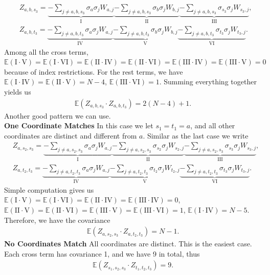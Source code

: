 \documentclass[10pt]{article}
\newcommand{\e}{\mathbb{E}}
\newenvironment{Proof of lemma}{\noindent{\bf Proof of Lemma}}{\hfill$\Box$\newline}
\newenvironment{Proof of claim}{\noindent{\bf Proof of claim}}{\hfill$\Box$\newline}
\newenvironment{Proof of theorem}{\noindent{\bf Proof of Theorem}}{\hfill\scriptsize{$\Box$}\newline}
\newenvironment{Proof of theorems}{\noindent{\bf Proof of Theorems}}{\hfill$\Box$\newline}
\newenvironment{Proof of proposition}{\noindent{\bf Proof of Proposition}}{\hfill$\Box$\newline}
\newenvironment{Proof of propositions}{\noindent{\bf Proof of Propositions}}{\hfill$\Box$\newline}
\newenvironment{Proof of exercise}{\noindent{\it Proof of Exercise:}}{\hfill$\Box$}
\numberwithin{equation}{section}
\begin{document}
\begin{align}
    &Z_{a,b,s_3} = \underbrace{- \sum_{j \neq a,b,s_3} \sigma_{a} \sigma_j W_{a,j}}_\text{I} \underbrace{- \sum_{j \neq a,b,s_3} \sigma_{b} \sigma_j W_{b,j}}_\text{II} \underbrace{- \sum_{j \neq a,b,s_3} \sigma_{s_3} \sigma_j W_{s_3,j}}_\text{III}, \\
    &Z_{a,b,t_3} = \underbrace{- \sum_{j \neq a,b,t_3} \sigma_{a} \sigma_j W_{a,j}}_\text{IV} \underbrace{- \sum_{j \neq a,b,t_3} \sigma_{b} \sigma_j W_{b,j}}_\text{V} \underbrace{- \sum_{j \neq a,b,t_3} \sigma_{t_3} \sigma_j W_{t_3,j}}_\text{VI}.
\end{align}
Among all the cross terms, $\e(\text{I} \cdot \text{V})=\e(\text{I} \cdot \text{VI}) = \e(\text{II} \cdot \text{IV}) = \e(\text{II} \cdot \text{VI}) = \e(\text{III} \cdot \text{IV}) = \e(\text{III} \cdot \text{V}) = 0$ because of index restrictions. For the rest terms, we have $\e(\text{I} \cdot \text{IV}) = \e(\text{II} \cdot \text{V}) = N-4$, $\e(\text{III} \cdot \text{VI}) = 1$. Summing everything together yields us
\begin{align}
    \e(Z_{a,b,s_3} \cdot Z_{a,b,t_3}) = 2(N-4)+1.
\end{align}
Another good pattern we can use.\\
\textbf{One Coordinate Matches} In this case we let $s_1 = t_1 =a$, and all other coordinates are distinct and different from $a$. Similar as the last case we write
\begin{align}
    &Z_{a,s_2,s_3} = \underbrace{- \sum_{j \neq a,s_2,s_3} \sigma_{a} \sigma_j W_{a,j}}_\text{I} \underbrace{- \sum_{j \neq a,s_2,s_3} \sigma_{s_2} \sigma_j W_{s_2,j}}_\text{II} \underbrace{- \sum_{j \neq a,s_2,s_3} \sigma_{s_3} \sigma_j W_{s_3,j}}_\text{III}, \\
    &Z_{a,t_2,t_3} = \underbrace{- \sum_{j \neq a,t_2,t_3} \sigma_{a} \sigma_j W_{a,j}}_\text{IV} \underbrace{- \sum_{j \neq a,t_2,t_3} \sigma_{t_2} \sigma_j W_{t_2,j}}_\text{V} \underbrace{- \sum_{j \neq a,t_2,t_3} \sigma_{t_3} \sigma_j W_{t_3,j}}_\text{VI}.
\end{align}
Simple computation gives us $\e(\text{I} \cdot \text{V})=\e(\text{I} \cdot \text{VI}) = \e(\text{II} \cdot \text{IV})  = \e(\text{III} \cdot \text{IV}) = 0$, $\e(\text{II} \cdot \text{V}) =\e(\text{II} \cdot \text{VI})= \e(\text{III} \cdot \text{V}) = \e(\text{III} \cdot \text{VI}) = 1$, $\e(\text{I} \cdot \text{IV}) = N-5$. Therefore, we have the covariance
\begin{align}
    \e(Z_{a,s_2,s_3} \cdot Z_{a,t_2,t_3}) = N-1.
\end{align}
\textbf{No Coordinates Match} All coordinates are distinct. This is the easiest case. Each cross term has covariance 1, and we have 9 in total, thus
\begin{align}
    \e(Z_{s_1,s_2,s_3} \cdot Z_{t_1,t_2,t_3}) = 9.
\end{align}
\end{document}
